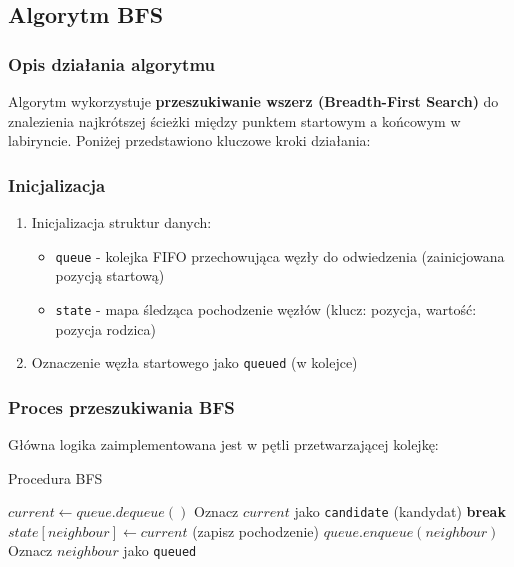 \documentclass[../../../../doc.tex]{subfiles}
\begin{document}
\subsection{Algorytm BFS}

\subsubsection{Opis działania algorytmu}

Algorytm wykorzystuje \textbf{przeszukiwanie wszerz (Breadth-First Search)} do znalezienia najkrótszej ścieżki między punktem startowym a końcowym w labiryncie. Poniżej przedstawiono kluczowe kroki działania:

\subsubsection{Inicjalizacja}
\begin{enumerate}
  \item Inicjalizacja struktur danych:
        \begin{itemize}
          \item \texttt{queue} - kolejka FIFO przechowująca węzły do odwiedzenia (zainicjowana pozycją startową)
          \item \texttt{state} - mapa śledząca pochodzenie węzłów (klucz: pozycja, wartość: pozycja rodzica)
        \end{itemize}
  \item Oznaczenie węzła startowego jako \texttt{queued} (w kolejce)
\end{enumerate}

\subsubsection{Proces przeszukiwania BFS}
Główna logika zaimplementowana jest w pętli przetwarzającej kolejkę:

\begin{algorithm}
  \caption{Procedura BFS}
  \begin{algorithmic}
    \STATE $current \gets queue.dequeue()$
    \STATE Oznacz $current$ jako \texttt{candidate} (kandydat)
    \STATE \textbf{break}
    \ENDIF
    \STATE $state[neighbour] \gets current$ (zapisz pochodzenie)
    \STATE $queue.enqueue(neighbour)$
    \STATE Oznacz $neighbour$ jako \texttt{queued}
    \ENDIF
    \ENDFOR
    \ENDWHILE
  \end{algorithmic}
\end{algorithm}
\end{document}

